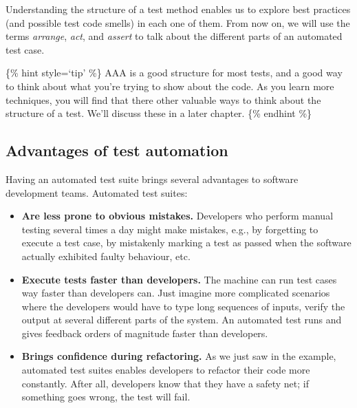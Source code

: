 \begin{Shaded}
\begin{Highlighting}[]
 \NormalTok{() \{}
  \NormalTok{;}


  \NormalTok{(}
\NormalTok{\}}
\end{Highlighting}
\end{Shaded}

Understanding the structure of a test method enables us to explore best
practices (and possible test code smells) in each one of them. From now
on, we will use the terms \emph{arrange}, \emph{act}, and \emph{assert}
to talk about the different parts of an automated test case.

\{\% hint style=`tip' \%\} AAA is a good structure for most tests, and a
good way to think about what you're trying to show about the code. As
you learn more techniques, you will find that there other valuable ways
to think about the structure of a test. We'll discuss these in a later
chapter. \{\% endhint \%\}

\hypertarget{advantages-of-test-automation}{%
\subsection{Advantages of test
automation}\label{advantages-of-test-automation}}

Having an automated test suite brings several advantages to software
development teams. Automated test suites:

\begin{itemize}
\item
  \textbf{Are less prone to obvious mistakes.} Developers who perform
  manual testing several times a day might make mistakes, e.g., by
  forgetting to execute a test case, by mistakenly marking a test as
  passed when the software actually exhibited faulty behaviour, etc.
\item
  \textbf{Execute tests faster than developers.} The machine can run
  test cases way faster than developers can. Just imagine more
  complicated scenarios where the developers would have to type long
  sequences of inputs, verify the output at several different parts of
  the system. An automated test runs and gives feedback orders of
  magnitude faster than developers.
\item
  \textbf{Brings confidence during refactoring.} As we just saw in the
  example, automated test suites enables developers to refactor their
  code more constantly. After all, developers know that they have a
  safety net; if something goes wrong, the test will fail.
\end{itemize}

